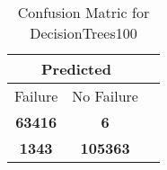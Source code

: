 \begin{table}[] 
\caption{Confusion Matric for DecisionTrees100} 
\label{Table: Prediction Accuracy-DMDDecisionTrees100100.0EKF-ignoresolarPanelDipole-solarPanelDipole} 
\centering 
\begin{tabular} 
 {@{}ccc@{}} 
\toprule 
\multicolumn{2}{c}{\textbf{Predicted}}
 \\ \midrule 
\multicolumn{1}{|c|}{Failure} & 
\multicolumn{1}{c|}{No Failure}
 \\ \midrule 
\multicolumn{1}{|c|}{\color{green}\textbf{63416}} & 
\multicolumn{1}{c|}{\color{red}\textbf{6}}
 \\ \midrule 
\multicolumn{1}{|c|}{\color{red}\textbf{1343}} & 
\multicolumn{1}{c|}{\color{green}\textbf{105363}}
 \\ \bottomrule 
\end{tabular} 
\end{table} 
